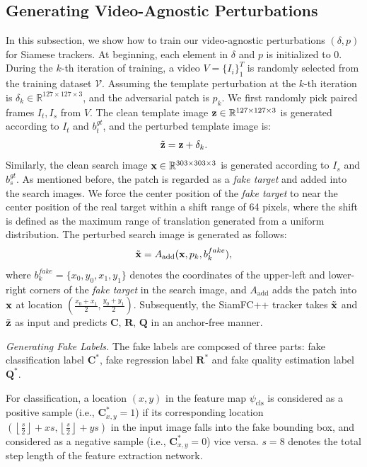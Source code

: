 \documentclass[journal]{IEEEtran}
\newcommand{\ie}{i.e.}
\renewcommand{\uline}{}
\begin{document}
\subsection{Generating Video-Agnostic Perturbations}\label{generate}

In this subsection, we show how to train our video-agnostic perturbations $(\delta, p)$ for Siamese trackers. At beginning, each element in $\delta$ and $p$ is initialized to 0. During the $k$-th iteration of training, a video $V=\{I_i\}_1^T$ is randomly selected from the training dataset $\mathcal V$. Assuming the template perturbation at the $k$-th iteration is $\delta_k \in \mathbb{R}^{127\times 127 \times 3}$, and the adversarial patch is $p_k$. We first randomly pick paired frames $I_t, I_s$ from $V$. The clean template image $\textbf z\in \mathbb{R}^{127\times 127 \times 3}$ is generated according to $I_t$ and $b^{gt}_t$, and the perturbed template image is:
\begin{equation}
\tilde {\textbf z} = \textbf z + \delta_k.
\end{equation}
Similarly, the clean search image $\textbf x \in \mathbb{R}^{303\times 303 \times 3}$ is generated according to $I_s$ and $b^{gt}_s$. As mentioned before, the patch is regarded as a \textit{fake target} and added into the search images. We force the center position of the \textit{fake target} to near the center position of the real target within a shift range of 64 pixels, where the shift is defined as the maximum range of translation generated from a uniform distribution. The perturbed search image is generated as follows:
\begin{equation}
\tilde{\textbf x} = A_{\text{add}}(\textbf x, p_k, b^{fake}_k),
\end{equation}
where $ b^{fake}_k = \{x_0, y_0, x_1, y_1\}$ denotes the coordinates of the upper-left and lower-right corners of the \textit{fake target} in the search image, \uline{and} $A_\text{add}$ adds the patch into $\textbf x$ at location $(\frac{x_0+x_1}{2},\frac{y_0+y_1}{2})$. Subsequently, the SiamFC++ tracker takes $\tilde {\textbf x}$ and $\tilde{\textbf z}$ as input and predicts $\textbf{C, R, Q}$ in an anchor-free manner.

\textit{Generating Fake Labels.} The fake labels are composed of three parts: fake classification label $\textbf{C}^*$, fake regression label $\textbf{R}^*$ and fake quality estimation label $\textbf{Q}^*$.

For classification, a location $(x,y)$ in the feature map $\psi_{\mathrm{cls}}$ is considered as a positive sample (\ie, $\textbf{C}^*_{x,y} = 1$) if its corresponding location $\left(\left\lfloor\frac{s}{2}\right\rfloor+x s,\left\lfloor\frac{s}{2}\right\rfloor+y s\right)$ in the input image falls into the fake bounding box, and considered as a negative sample (\ie, $\textbf{C}^*_{x,y} = 0$) vice versa. $s=8$ denotes the total step length of the feature extraction network.
\end{document}
